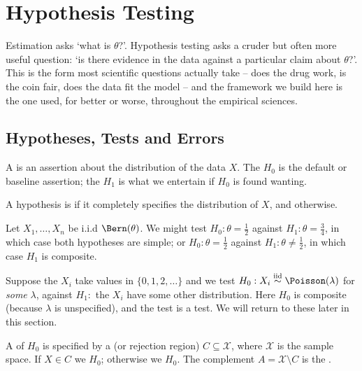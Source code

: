 \section{Hypothesis Testing}

Estimation asks `what is $\theta$?'. Hypothesis testing asks a cruder but often more useful question: `is there evidence in the data against a particular claim about $\theta$?'. This is the form most scientific questions actually take -- does the drug work, is the coin fair, does the data fit the model -- and the framework we build here is the one used, for better or worse, throughout the empirical sciences.

\subsection{Hypotheses, Tests and Errors}

\begin{definition}[Hypothesis]
  A  is an assertion about the distribution of the data $X$. The  $H_0$ is the default or baseline assertion; the  $H_1$ is what we entertain if $H_0$ is found wanting.

  A hypothesis is  if it completely specifies the distribution of $X$, and  otherwise.
\end{definition}

\begin{example}
  Let $X_1, \dots, X_n$ be i.i.d $\Bern(\theta)$. We might test $H_0 : \theta = \frac{1}{2}$ against $H_1 : \theta = \frac{3}{4}$, in which case both hypotheses are simple; or $H_0 : \theta = \frac{1}{2}$ against $H_1 : \theta \neq \frac{1}{2}$, in which case $H_1$ is composite.
\end{example}

\begin{example}
  Suppose the $X_i$ take values in $\{0, 1, 2, \dots\}$ and we test $H_0 : X_i \stackrel{\text{iid}}{\sim} \Poisson(\lambda)$ for \emph{some} $\lambda$, against $H_1 :$ the $X_i$ have some other distribution. Here $H_0$ is composite (because $\lambda$ is unspecified), and the test is a  test. We will return to these later in this section.
\end{example}

\begin{definition}[Test]
  A  of $H_0$ is specified by a  (or rejection region) $C \subseteq \mathcal{X}$, where $\mathcal{X}$ is the sample space. If $X \in C$ we  $H_0$; otherwise we  $H_0$. The complement $A = \mathcal{X}\setminus C$ is the .
\end{definition}

